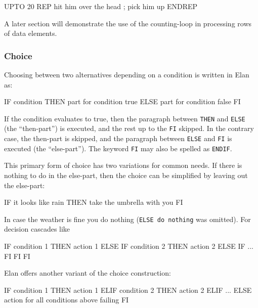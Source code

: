 \pagebreak
\begin{elan}
        UPTO 20
        REP
          hit him over the head ;
          pick him up
        ENDREP
\end{elan}

\noindent
A later section will demonstrate the use of the counting-loop
in processing rows of data elements.

\subsubsection{Choice}

Choosing between two alternatives depending on a condition is
written in Elan as:

\begin{elan}
        IF condition
        THEN
          part for condition true
        ELSE
          part for condition false
        FI
\end{elan}

\noindent
If the condition evaluates to true, then the paragraph
between {\tt THEN} and {\tt ELSE} (the ``then-part'') is executed,
and the rest up to the {\tt FI} skipped. In the contrary case,
the then-part is skipped, and the paragraph between {\tt ELSE}
and {\tt FI} is executed (the ``else-part'').
The keyword {\tt FI} may also be spelled as {\tt ENDIF}.

This primary form of choice has two variations for common needs.
If there is nothing to do in the else-part, then the choice can
be simplified by leaving out the else-part:

\begin{elan}
        IF it looks like rain
        THEN
          take the umbrella with you
        FI
\end{elan}

\noindent
In case the weather is fine you do nothing ({\tt ELSE do nothing}
was omitted).
For decision cascades like

\begin{elan}
        IF condition 1
        THEN
          action 1
        ELSE
          IF condition 2
          THEN
            action 2
          ELSE
            IF
              ...
            FI
          FI
        FI
\end{elan}

\noindent
Elan offers another variant of the choice construction:

\begin{elan}
        IF condition 1
        THEN
          action 1
        ELIF condition 2
        THEN
          action 2
        ELIF
          ...
        ELSE
          action for all conditions above failing
        FI
\end{elan}


